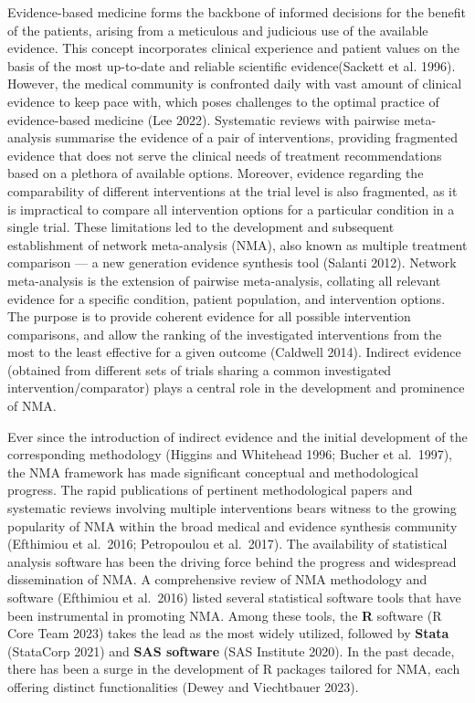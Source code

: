 Evidence-based medicine forms the backbone of informed decisions for the benefit of the patients, arising from a meticulous and judicious use of the available evidence. This concept incorporates clinical experience and patient values on the basis of the most up-to-date and reliable scientific evidence(Sackett et al. 1996).
However, the medical community is confronted daily with vast amount of clinical evidence to keep pace with, which poses challenges to the optimal practice of evidence-based medicine (Lee 2022).
Systematic reviews with pairwise meta-analysis summarise the evidence of a pair of interventions, providing fragmented evidence that does not serve the clinical needs of treatment recommendations based on a plethora of available options.
Moreover, evidence regarding the comparability of different interventions at the trial level is also fragmented, as it is impractical to compare all intervention options for a particular condition in a single trial. These limitations led to the development and subsequent establishment of network meta-analysis (NMA), also known as multiple treatment comparison --- a new generation evidence synthesis tool (Salanti 2012). Network meta-analysis is the extension of pairwise meta-analysis, collating all relevant evidence for a specific condition, patient population, and intervention options. The purpose is to provide coherent evidence for all possible intervention comparisons, and allow the ranking of the investigated interventions from the most to the least effective for a given outcome (Caldwell 2014). Indirect evidence (obtained from different sets of trials sharing a common investigated intervention/comparator) plays a central role in the development and prominence of NMA.

Ever since the introduction of indirect evidence and the initial development of the corresponding methodology (Higgins and Whitehead 1996; Bucher et al.~1997), the NMA framework has made
significant conceptual and methodological progress. The rapid publications of pertinent methodological papers and systematic reviews involving multiple interventions bears witness to the growing popularity of NMA within the broad medical and evidence synthesis community (Efthimiou et al.~2016; Petropoulou et al.~2017). The availability of statistical analysis software has been the driving force behind the progress and widespread dissemination of NMA. A comprehensive review of NMA methodology and software (Efthimiou et al.~2016) listed several statistical software tools that have been instrumental in promoting NMA. Among these tools, the \textbf{R} software (R Core Team 2023) takes the lead as the most widely utilized, followed by \textbf{Stata} (StataCorp 2021) and \textbf{SAS software} (SAS Institute 2020). In the past decade, there has been a surge in the development of R packages tailored for NMA, each offering distinct functionalities (Dewey and Viechtbauer 2023).


